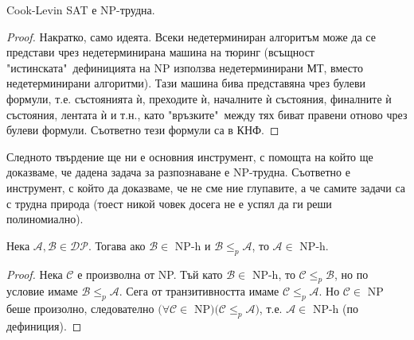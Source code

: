\begin{boxtheorem}{Cook-Levin}{}
	SAT е NP-трудна.
\end{boxtheorem}
\begin{proof}
	Накратко, само идеята. Всеки недетерминиран алгоритъм може да се представи чрез недетерминирана машина на тюринг (всъщност "истинската"\ дефиницията на NP използва недетерминирани МТ, вместо недетерминирани алгоритми). Тази машина бива представяна чрез булеви формули, т.е. състоянията ѝ, преходите ѝ, началните ѝ състояния, финалните ѝ състояния, лентата ѝ и т.н., като "връзките"\ между тях биват правени отново чрез булеви формули. Съответно тези формули са в КНФ.
\end{proof}\vspace{0.3cm}

\noindent
Следното твърдение ще ни е основния инструмент, с помощта на който ще доказваме, че дадена задача за разпознаване е NP-трудна. Съответно е инструмент, с който да доказваме, че не сме ние глупавите, а че самите задачи са с трудна природа (тоест никой човек досега не е успял да ги реши полиномиално).
\begin{boxproposition}{}{}
	Нека $\mathcal{A},\mathcal{B}\in\mathcal{DP}$. Тогава ако $\mathcal{B}\in$ NP-h и $\mathcal{B}\le_p\mathcal{A}$, то $\mathcal{A}\in$ NP-h.
\end{boxproposition}
\begin{proof}
	Нека $\mathcal{C}$ е произволна от NP. Тъй като $\mathcal{B}\in$ NP-h, то $\mathcal{C}\le_p\mathcal{B}$, но по условие имаме $\mathcal{B}\le_p\mathcal{A}$. Сега от транзитивността имаме $\mathcal{C}\le_p\mathcal{A}$. Но $\mathcal{C}\in$ NP беше произолно, следователно $\big(\forall\mathcal{C}\in$ NP$\big)\big(\mathcal{C}\le_p\mathcal{A}\big)$, т.е. $\mathcal{A}\in$ NP-h (по дефиниция).
\end{proof}